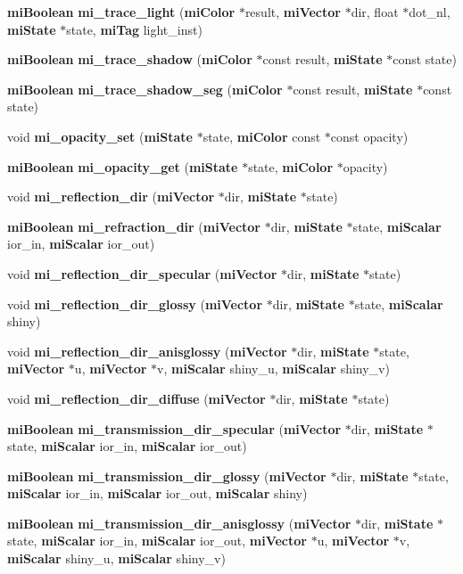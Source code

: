 \begin{CompactItemize}
\item 
{\bf mi\-Boolean} {\bf mi\_\-trace\_\-light} ({\bf mi\-Color} $\ast$result, {\bf mi\-Vector} $\ast$dir, float $\ast$dot\_\-nl, {\bf mi\-State} $\ast$state, {\bf mi\-Tag} light\_\-inst)
\item 
{\bf mi\-Boolean} {\bf mi\_\-trace\_\-shadow} ({\bf mi\-Color} $\ast$const result, {\bf mi\-State} $\ast$const state)
\item 
{\bf mi\-Boolean} {\bf mi\_\-trace\_\-shadow\_\-seg} ({\bf mi\-Color} $\ast$const result, {\bf mi\-State} $\ast$const state)
\item 
void {\bf mi\_\-opacity\_\-set} ({\bf mi\-State} $\ast$state, {\bf mi\-Color} const $\ast$const opacity)
\item 
{\bf mi\-Boolean} {\bf mi\_\-opacity\_\-get} ({\bf mi\-State} $\ast$state, {\bf mi\-Color} $\ast$opacity)
\item 
void {\bf mi\_\-reflection\_\-dir} ({\bf mi\-Vector} $\ast$dir, {\bf mi\-State} $\ast$state)
\item 
{\bf mi\-Boolean} {\bf mi\_\-refraction\_\-dir} ({\bf mi\-Vector} $\ast$dir, {\bf mi\-State} $\ast$state, {\bf mi\-Scalar} ior\_\-in, {\bf mi\-Scalar} ior\_\-out)
\item 
void {\bf mi\_\-reflection\_\-dir\_\-specular} ({\bf mi\-Vector} $\ast$dir, {\bf mi\-State} $\ast$state)
\item 
void {\bf mi\_\-reflection\_\-dir\_\-glossy} ({\bf mi\-Vector} $\ast$dir, {\bf mi\-State} $\ast$state, {\bf mi\-Scalar} shiny)
\item 
void {\bf mi\_\-reflection\_\-dir\_\-anisglossy} ({\bf mi\-Vector} $\ast$dir, {\bf mi\-State} $\ast$state, {\bf mi\-Vector} $\ast$u, {\bf mi\-Vector} $\ast$v, {\bf mi\-Scalar} shiny\_\-u, {\bf mi\-Scalar} shiny\_\-v)
\item 
void {\bf mi\_\-reflection\_\-dir\_\-diffuse} ({\bf mi\-Vector} $\ast$dir, {\bf mi\-State} $\ast$state)
\item 
{\bf mi\-Boolean} {\bf mi\_\-transmission\_\-dir\_\-specular} ({\bf mi\-Vector} $\ast$dir, {\bf mi\-State} $\ast$state, {\bf mi\-Scalar} ior\_\-in, {\bf mi\-Scalar} ior\_\-out)
\item 
{\bf mi\-Boolean} {\bf mi\_\-transmission\_\-dir\_\-glossy} ({\bf mi\-Vector} $\ast$dir, {\bf mi\-State} $\ast$state, {\bf mi\-Scalar} ior\_\-in, {\bf mi\-Scalar} ior\_\-out, {\bf mi\-Scalar} shiny)
\item 
{\bf mi\-Boolean} {\bf mi\_\-transmission\_\-dir\_\-anisglossy} ({\bf mi\-Vector} $\ast$dir, {\bf mi\-State} $\ast$state, {\bf mi\-Scalar} ior\_\-in, {\bf mi\-Scalar} ior\_\-out, {\bf mi\-Vector} $\ast$u, {\bf mi\-Vector} $\ast$v, {\bf mi\-Scalar} shiny\_\-u, {\bf mi\-Scalar} shiny\_\-v)

\end{CompactItemize}
